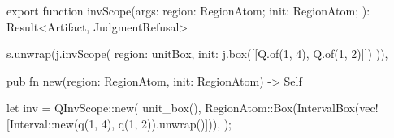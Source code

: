 \begin{tssrc}
export function invScope(args: {
  region: RegionAtom;
  init: RegionAtom;
}): Result<Artifact, JudgmentRefusal>
\end{tssrc}
\begin{tssrc}
s.unwrap(j.invScope({ region: unitBox, init: j.box([[Q.of(1, 4), Q.of(1, 2)]]) })),
\end{tssrc}
\begin{rustsrc}
pub fn new(region: RegionAtom, init: RegionAtom) -> Self
\end{rustsrc}
\begin{rustsrc}
let inv = QInvScope::new(
    unit_box(),
    RegionAtom::Box(IntervalBox(vec![Interval::new(q(1, 4), q(1, 2)).unwrap()])),
);
\end{rustsrc}
